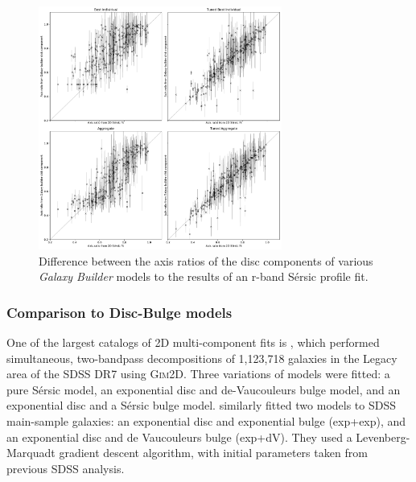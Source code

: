 \documentclass[../main.tex]{subfiles}
\begin{document}
\begin{figure}
  \includegraphics[width=8cm]{images__results/gzb-agg-nsa-comparison_all.pdf}
  \caption{Difference between the axis ratios of the disc components of various \textit{Galaxy Builder} models to the results of an r-band S\'ersic profile fit.}
  \label{fig:ax_ratio_comparison}
\end{figure}


\subsubsection{Comparison to Disc-Bulge models}

One of the largest catalogs of 2D multi-component fits is \citet{2011ApJS..196...11S}, which performed simultaneous, two-bandpass decompositions of 1,123,718 galaxies in the Legacy area of the SDSS DR7 using \textsc{Gim2D}. Three variations of models were fitted: a pure S\'ersic model, an exponential disc and de-Vaucouleurs bulge model, and an exponential disc and a S\'ersic bulge model. \citet{2012MNRAS.421.2277L} similarly fitted two models to SDSS main-sample galaxies: an exponential disc and exponential bulge (exp+exp), and an exponential disc and de Vaucouleurs bulge (exp+dV). They used a Levenberg-Marquadt gradient descent algorithm, with initial parameters taken from previous SDSS analysis.
\end{document}
